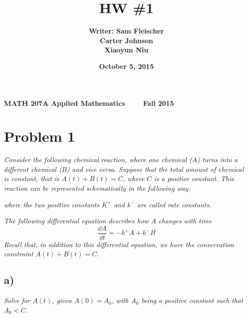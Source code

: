 \documentclass[12pt]{article}
\title{\bf HW \#1}
\author{\bf Writer: Sam Fleischer \\ \bf Carter Johnson \\ \bf Xiaoyun Niu}
\date{\bf October 5, 2015}
\begin{document}
{\bf MATH 207A \hfill Applied Mathematics \ \ \ \ \hfill Fall 2015} 

{\let\newpage\relax\maketitle}

\section*{Problem 1}
{\it Consider the following chemical reaction, where one chemical ($A$) turns into a different chemical ($B$) and vice versa.  Suppose that the total amount of chemical is constant, that is $A(t) + B(t) = C$, where $C$ is a positice constant.  This reaction can be represented schematically in the following way:}
\begin{center}
\end{center}
{\it where the two positive constants $K^+$ and $k^-$ are called rate constants.}

{\it The following differential equation describes how $A$ changes with time}
\begin{equation}
	\label{change_chem_A}
	\frac{\dd A}{\dd t} = -k^+ A + k^- B
\end{equation}
{\it Recall that, in addition to this differential equation, we have the conservation constraint $A(t) + B(t) = C$.}

\subsection*{ a)}
{\it Solve for $A(t)$, given $A(0) = A_0$, with $A_0$ being a positive constant such that $A_0 < C$.} \\
\end{document}
